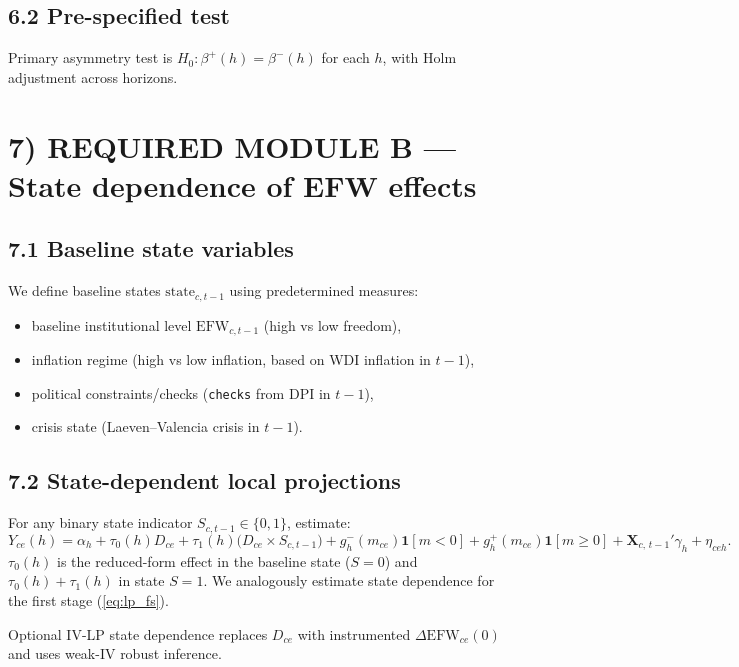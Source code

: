 \documentclass[11pt]{article}
\newcommand{\EFW}{\mathrm{EFW}}
\newcommand{\IV}{\mathrm{IV}}
\newcommand{\bX}{\mathbf{X}}
\newcommand{\1}{\mathbf{1}}
\newcommand{\state}{\mathrm{state}}
\newcommand{\cid}{c}
\newcommand{\eid}{e}
\begin{document}
\subsection*{6.2 Pre-specified test}
Primary asymmetry test is $H_0:\beta^{+}(h)=\beta^{-}(h)$ for each $h$, with Holm adjustment across horizons.

\section*{7) REQUIRED MODULE B --- State dependence of EFW effects}

\subsection*{7.1 Baseline state variables}
We define baseline states $\state_{\cid,t-1}$ using predetermined measures:
\begin{itemize}[leftmargin=1.2em]
\item baseline institutional level $\EFW_{\cid,t-1}$ (high vs low freedom),
\item inflation regime (high vs low inflation, based on WDI inflation in $t-1$),
\item political constraints/checks (\texttt{checks} from DPI in $t-1$),
\item crisis state (Laeven--Valencia crisis in $t-1$).
\end{itemize}

\subsection*{7.2 State-dependent local projections}
For any binary state indicator $S_{\cid,t-1}\in\{0,1\}$, estimate:
\begin{equation}
Y_{\cid \eid}(h) = \alpha_h + \tau_0(h)D_{\cid \eid} + \tau_1(h)\big(D_{\cid \eid}\times S_{\cid,t-1}\big)
+ g_{h}^{-}(m_{\cid \eid})\1[m<0] + g_{h}^{+}(m_{\cid \eid})\1[m\ge 0] + \bX_{\cid,\,t-1}'\gamma_h + \eta_{\cid \eid h}.
\label{eq:lp_state}
\end{equation}
$\tau_0(h)$ is the reduced-form effect in the baseline state ($S=0$) and $\tau_0(h)+\tau_1(h)$ in state $S=1$. We analogously estimate state dependence for the first stage (\ref{eq:lp_fs}).

Optional $\IV$-LP state dependence replaces $D_{\cid \eid}$ with instrumented $\Delta \EFW_{\cid \eid}(0)$ and uses weak-IV robust inference.
\end{document}
